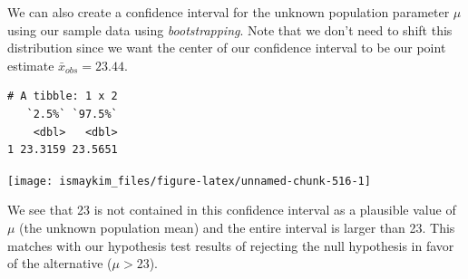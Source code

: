 \documentclass[12pt, krantz2,]{krantz}
\makeatletter
\newenvironment{Shaded}{\begin{snugshade}}{\end{snugshade}}
\newcommand{\DataTypeTok}[1]{\textcolor[rgb]{0.27,0.27,0.27}{#1}}
\newcommand{\DecValTok}[1]{\textcolor[rgb]{0.06,0.06,0.06}{#1}}
\newcommand{\KeywordTok}[1]{\textcolor[rgb]{0.27,0.27,0.27}{\textbf{#1}}}
\newcommand{\NormalTok}[1]{#1}
\newcommand{\OperatorTok}[1]{\textcolor[rgb]{0.43,0.43,0.43}{\textbf{#1}}}
\newcommand{\StringTok}[1]{\textcolor[rgb]{0.5,0.5,0.5}{#1}}
\newenvironment{kframe}{%
\medskip{}
\setlength{\fboxsep}{.8em}
 \def\at@end@of@kframe{}%
 \ifinner\ifhmode%
  \def\at@end@of@kframe{\end{minipage}}%
  \begin{minipage}{\columnwidth}%
 \fi\fi%
 \def\FrameCommand##1{\hskip\@totalleftmargin \hskip-\fboxsep
 \colorbox{shadecolor}{##1}\hskip-\fboxsep
     \hskip-\linewidth \hskip-\@totalleftmargin \hskip\columnwidth}%
 \MakeFramed {\advance\hsize-\width
   \@totalleftmargin\z@ \linewidth\hsize
   \@setminipage}}%
 {\par\unskip\endMakeFramed%
 \at@end@of@kframe}
\renewenvironment{Shaded}{\begin{kframe}}{\end{kframe}}
\makeatother
\begin{document}
We can also create a confidence interval for the unknown population parameter \(\mu\) using our sample data using \emph{bootstrapping}. Note that we don't need to shift this distribution since we want the center of our confidence interval to be our point estimate \(\bar{x}_{obs} = 23.44\).

\begin{Shaded}
\end{Shaded}

\begin{Shaded}
\end{Shaded}

\begin{verbatim}
# A tibble: 1 x 2
   `2.5%` `97.5%`
    <dbl>   <dbl>
1 23.3159 23.5651
\end{verbatim}

\begin{Shaded}
\end{Shaded}

\begin{center}\texttt{[image: ismaykim\_files/figure-latex/unnamed-chunk-516-1]} \end{center}

We see that 23 is not contained in this confidence interval as a plausible value of \(\mu\) (the unknown population mean) and the entire interval is larger than 23. This matches with our hypothesis test results of rejecting the null hypothesis in favor of the alternative (\(\mu > 23\)).
\end{document}
